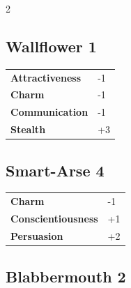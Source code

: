 \begin{multicols}{2}
\begin{tcolorbox}
\end{tcolorbox}

\begin{tcolorbox}
    \subsection*{Wallflower \hfill \small{1 }}
    \tcblower




\begin{tabular}{@{}ll@{}}
    \textbf{Attractiveness} & -1\\
    \textbf{Charm} & -1\\
    \textbf{Communication} & -1\\
    \textbf{Stealth} & +3\\
\end{tabular}


\end{tcolorbox}

\begin{tcolorbox}
    \subsection*{Smart-Arse \hfill \small{4 }}
    \tcblower




\begin{tabular}{@{}ll@{}}
    \textbf{Charm} & -1\\
    \textbf{Conscientiousness} & +1\\
    \textbf{Persuasion} & +2\\
\end{tabular}


\end{tcolorbox}

\begin{tcolorbox}
    \subsection*{Blabbermouth \hfill \small{2 }}
    \tcblower





\end{tcolorbox}
\end{multicols}
